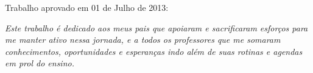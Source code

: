 \documentclass[	12pt, Times, openright, twoside, a4paper, english, brazil]{abntex2}
\begin{document}
%
% 
%
\begin{folhadeaprovacao}
  \begin{center}
    {\ABNTEXchapterfont\large\imprimirautor}

    \vspace*{\fill}\vspace*{\fill}
    {\ABNTEXchapterfont\bfseries\Large\imprimirtitulo}
    \vspace*{\fill}
    
    \hspace{.45\textwidth}
    \begin{minipage}{.5\textwidth}
        \imprimirpreambulo
    \end{minipage}%
    \vspace*{\fill}
   \end{center}
    
   Trabalho aprovado em 01 de Julho de 2013:

      
   \begin{center}
    \vspace*{0.5cm}
    {\large\imprimirlocal}
    \par
    {\large\imprimirdata}
    \vspace*{1cm}
  \end{center}
  
\end{folhadeaprovacao}

\begin{dedicatoria}
   \vspace*{\fill}
   \centering
   \noindent
   \textit{ Este trabalho é dedicado aos meus pais que apoiaram e sacrificaram esforços para me manter ativo nessa jornada, e a todos os professores que me somaram conhecimentos, oportunidades e esperanças indo além de suas rotinas e agendas em prol do ensino. } \vspace*{\fill}
\end{dedicatoria}
\end{document}
